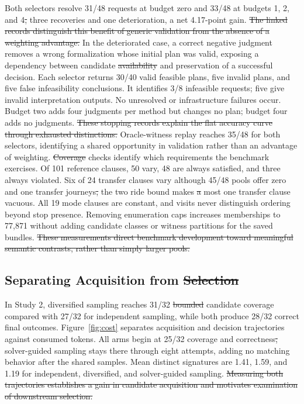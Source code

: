 \documentclass[a4paper,twoside]{article}
\providecommand{\DIFaddtex}[1]{{\protect\color{blue}\uwave{#1}}} %
\providecommand{\DIFdeltex}[1]{{\protect\color{red}\sout{#1}}}                      %
\providecommand{\DIFaddbegin}{} %
\providecommand{\DIFaddend}{} %
\providecommand{\DIFdelbegin}{} %
\providecommand{\DIFdelend}{} %
\providecommand{\DIFadd}[1]{\texorpdfstring{\DIFaddtex{#1}}{#1}} %
\providecommand{\DIFdel}[1]{\texorpdfstring{\DIFdeltex{#1}}{}} %
\begin{document}
Both selectors resolve 31/48 requests at budget zero and 33/48 at budgets 1, 2, and 4\DIFdelbegin \DIFdel{, }\DIFdelend \DIFaddbegin \DIFadd{: }\DIFaddend three recoveries and one deterioration, a net 4.17-point gain. \DIFdelbegin \DIFdel{The linked records distinguish this benefit of generic validation from the absence of a weighting advantage. }\DIFdelend In the deteriorated case, a correct negative judgment removes a wrong formalization whose initial plan was valid, exposing a dependency between candidate \DIFdelbegin \DIFdel{availability }\DIFdelend \DIFaddbegin \DIFadd{coverage }\DIFaddend and preservation of a successful decision.
Each selector returns 30/40 valid feasible plans, five invalid plans, and five false infeasibility conclusions. It identifies 3/8 infeasible requests; five give invalid interpretation outputs. No unresolved or infrastructure failures occur. Budget two adds four judgments per method but changes no plan; budget four adds no judgments. \DIFdelbegin \DIFdel{These stopping records explain the flat accuracy curve through exhausted distinctions. }\DIFdelend Oracle-witness replay reaches 35/48 for both selectors, identifying a shared opportunity in validation rather than an advantage of weighting.
\DIFdelbegin \DIFdel{Coverage }\DIFdelend \DIFaddbegin \DIFadd{Clause }\DIFaddend checks identify which requirements the benchmark exercises. Of 101 reference clauses, 50 vary, 48 are always satisfied, and three always violated. Six of 24 transfer clauses vary although 45/48 pools offer zero and one transfer journeys\DIFdelbegin \DIFdel{, }\DIFdelend \DIFaddbegin \DIFadd{; }\DIFaddend the two ride bound makes \DIFdelbegin \DIFdel{a }\DIFdelend \DIFaddbegin \DIFadd{an at }\DIFaddend most one transfer clause vacuous. All 19 mode clauses are constant, and visits never distinguish ordering beyond stop presence. Removing enumeration caps increases memberships to 77,871 without adding candidate classes or witness partitions for the saved bundles. 
\DIFdelbegin \DIFdel{These measurements direct benchmark development toward meaningful semantic contrasts, rather than simply larger pools.
}\DIFdelend 



\subsection{Separating Acquisition from \DIFdelbegin \DIFdel{Selection}\DIFdelend \DIFaddbegin \DIFadd{Final Choice}\DIFaddend }

In Study 2, diversified sampling reaches 31/32 \DIFdelbegin \DIFdel{bounded }\DIFdelend candidate coverage compared with 27/32 for independent sampling, while both produce 28/32 correct final outcomes. Figure~\ref{fig:cost} separates acquisition and decision trajectories against consumed tokens. All arms begin at 25/32 coverage and correctness\DIFdelbegin \DIFdel{, }\DIFdelend \DIFaddbegin \DIFadd{; }\DIFaddend solver-guided sampling stays there through eight attempts, adding no matching behavior after the shared samples. Mean distinct signatures are 1.41, 1.59, and 1.19 for independent, diversified, and solver-guided sampling. 
\DIFdelbegin \DIFdel{Measuring both trajectories establishes a gain in candidate acquisition and motivates examination of downstream selection.
}\DIFdelend 
\end{document}
